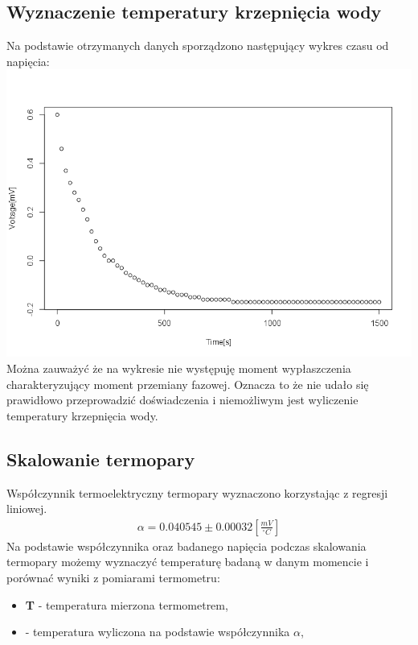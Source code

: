 \documentclass[11pt]{article}
\begin{document}
    \subsection*{Wyznaczenie temperatury krzepnięcia wody}
    Na podstawie otrzymanych danych sporządzono następujący wykres czasu od napięcia:
    \includegraphics[scale = 0.5]{"Img/Rplot01.png"}\\
    Można zauważyć że na wykresie nie występuję moment wypłaszczenia charakteryzujący moment przemiany fazowej.
    Oznacza to że nie udało się prawidłowo przeprowadzić doświadczenia i niemożliwym jest wyliczenie temperatury krzepnięcia wody.

    \subsection*{Skalowanie termopary}
    \indent Współczynnik termoelektryczny termopary wyznaczono korzystając z regresji liniowej.\\
    \begin{gather*}
        \alpha=0.040545\pm 0.00032[\frac{mV}{^\circ C}]
    \end{gather*}
    Na podstawie współczynnika oraz badanego napięcia
    podczas skalowania termopary możemy wyznaczyć temperaturę badaną w danym momencie i porównać wyniki z
    pomiarami termometru:
    \begin{center}
    \end{center}
    {\footnotesize
        \begin{itemize}
            \item[] \textbf{T} - temperatura mierzona termometrem,
            \item[]  - temperatura wyliczona na podstawie współczynnika $\alpha$,
        \end{itemize}}
\end{document}
